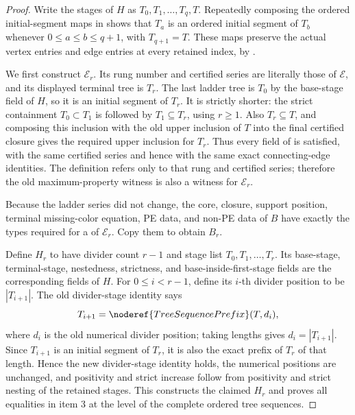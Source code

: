 \begin{proof}
Write the stages of $H$ as $T_0,T_1,\ldots,T_q,T$.  Repeatedly composing
the ordered initial-segment maps in  shows that
$T_a$ is an ordered initial segment of $T_b$ whenever
$0\leq a\leq b\leq q+1$, with $T_{q+1}=T$.  These maps preserve the actual
vertex entries and edge entries at every retained index, by
.

We first construct $\mathcal E_r$.  Its rung number and certified series
are literally those of $\mathcal E$, and its displayed terminal tree is
$T_r$.  The last ladder tree is $T_0$ by the base-stage field of $H$, so it
is an initial segment of $T_r$.  It is strictly shorter: the strict
containment $T_0\subset T_1$ is followed by $T_1\subseteq T_r$, using
$r\geq1$.  Also $T_r\subseteq T$, and composing this inclusion with the
old upper inclusion of $T$ into the final certified closure gives the
required upper inclusion for $T_r$.  Thus every field of
 is satisfied, with the same certified
series and hence with the same exact connecting-edge identities.  The
definition  refers only to that rung and certified
series; therefore the old maximum-property witness is also a witness for
$\mathcal E_r$.

Because the ladder series did not change, the core, closure, support
position, terminal missing-color equation, PE data, and non-PE data of $B$
have exactly the types required for a  of
$\mathcal E_r$.  Copy them to obtain $B_r$.

Define $H_r$ to have divider count $r-1$ and stage list
$T_0,T_1,\ldots,T_r$.  Its base-stage, terminal-stage, nestedness,
strictness, and base-inside-first-stage fields are the corresponding fields
of $H$.  For $0\leq i<r-1$, define its $i$-th divider position to be
$|T_{i+1}|$.  The old divider-stage identity says
\[
 T_{i+1}=\noderef{TreeSequencePrefix}(T,d_i),
\]
where $d_i$ is the old numerical divider position; taking lengths gives
$d_i=|T_{i+1}|$.  Since $T_{i+1}$ is an initial segment of $T_r$, it is
also the exact prefix of $T_r$ of that length.  Hence the new divider-stage
identity holds, the numerical positions are unchanged, and positivity and
strict increase follow from positivity and strict nesting of the retained
stages.  This constructs the claimed  $H_r$
and proves all equalities in item 3 at the level of the complete ordered
tree sequences.


\end{proof}
